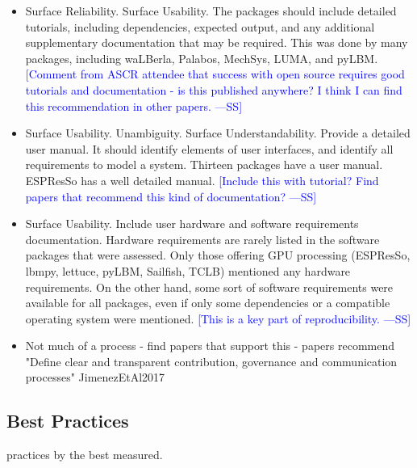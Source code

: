 \documentclass[final, 3p, times, authoryear]{elsarticle}
\newcommand{\authornote}[3]{\textcolor{#1}{[#3 ---#2]}}
\newcommand{\authornote}[3]{}
\newcommand{\wss}[1]{\authornote{blue}{SS}{#1}} %
\begin{document}
\begin{itemize}
	\item Surface Reliability. Surface Usability. The packages should include
	detailed tutorials, including dependencies, expected output, and any
	additional supplementary documentation that may be required. This was done
	by many packages, including waLBerla, Palabos, MechSys, LUMA, and pyLBM.
	\wss{Comment from ASCR attendee that success with open source requires good
	tutorials and documentation - is this published anywhere?  I think I can
	find this recommendation in other papers.}
	\item Surface Usability. Unambiguity. Surface Understandability. Provide a
	detailed user manual. It should identify elements of user interfaces, and
	identify all requirements to model a system. Thirteen packages have a user
	manual. ESPResSo has a well detailed manual. \wss{Include this with
	tutorial?  Find papers that recommend this kind of documentation?}
	\item Surface Usability. Include user hardware and software requirements
	documentation. Hardware requirements are rarely listed in the software
	packages that were assessed. Only those offering GPU processing (ESPResSo,
	lbmpy, lettuce, pyLBM, Sailfish, TCLB) mentioned any hardware requirements.
	On the other hand, some sort of software requirements were available for all
	packages, even if only some dependencies or a compatible operating system
	were mentioned.  \wss{This is a key part of reproducibility.}
    \item Not much of a process - find papers that support this - papers
    recommend "Define clear and transparent contribution, governance and
    communication processes" JimenezEtAl2017
\end{itemize}

\subsection{Best Practices} \label{bestPractices}

practices by the best measured.
\end{document}
